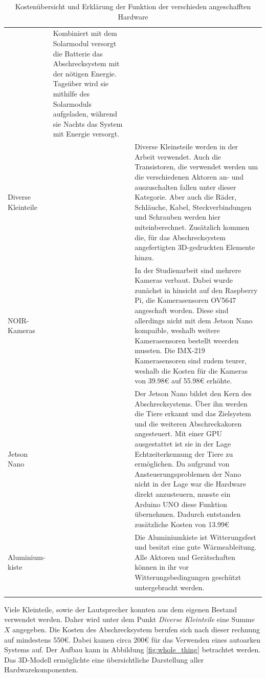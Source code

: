 \begin{longtable}{ p{}|p{}|p{} }
    & Kombiniert mit dem Solarmodul versorgt die Batterie das Abschrecksystem mit der nötigen Energie. Tagsüber wird sie mithilfe des Solarmoduls aufgeladen, während sie Nachts das System mit Energie versorgt. \cite{Autobatterie}
    \\
    Diverse Kleinteile
    & \centering{35 + X}
    & Diverse Kleinsteile werden in der Arbeit verwendet. Auch die Transistoren, die verwendet werden um die verschiedenen Aktoren an- und auszuschalten fallen unter dieser Kategorie. Aber auch die Räder, Schläuche, Kabel, Steckverbindungen und Schrauben werden hier miteinberechnet. Zusätzlich kommen die, für das Abschrecksystem angefertigten 3D-gedruckten Elemente hinzu.
    \\
    NOIR-Kameras
    & \centering55.98
    & In der Studienarbeit sind mehrere Kameras verbaut. Dabei wurde zunächst in hinsicht auf den Raspberry Pi, die Kamerasensoren OV5647 angeschaft worden. Diese sind allerdings nicht mit dem Jetson Nano kompaible, weshalb weitere Kamerasensoren bestellt weerden mussten. Die IMX-219 Kamerasensoren sind zudem teurer, weshalb die Kosten für die Kameras von 39.98€ auf 55.98€ erhöhte.
    \\
    Jetson Nano
    & \centering189
    &  Der Jetson Nano bildet den Kern des Abschrecksystems. Über ihn werden die Tiere erkannt und das Zielsystem und die weiteren Abschreckakoren angesteuert. Mit einer GPU ausgestattet ist sie in der Lage Echtzeiterkennung der Tiere zu ermöglichen.\newline
    Da aufgrund von Ansteuerungsproblemen der Nano nicht in der Lage war die Hardware direkt anzusteuern, musste ein Arduino UNO diese Funktion übernehmen. Dadurch entstanden zusätzliche Kosten von 13.99€\\
    Aluminium-kiste
    & \centering{109 DM}
    & Die Aluminiumkiste ist Witterungsfest und besitzt eine gute Wärmeableitung. Alle Aktoren und Gerätschaften können in ihr vor Witterungsbedingungen geschützt untergebracht werden.\\
    \caption{Kostenübersicht und Erklärung der Funktion der verschieden angeschafften Hardware}
\end{longtable}

Viele Kleinteile, sowie der Lautsprecher konnten aus dem eigenen Bestand verwendet werden. Daher wird unter dem Punkt \textit{Diverse Kleinteile} eine Summe $X$ angegeben. Die Kosten des Abschrecksystem berufen sich nach dieser rechnung auf mindestens 550€. Dabei kamen circa 200€ für das Verwenden eines autoarken Systems auf. Der Aufbau kann in Abbildung \ref{fig:whole_thing} betrachtet werden. Das 3D-Modell ermöglichte eine übersichtliche Darstellung aller Hardwarekomponenten.

